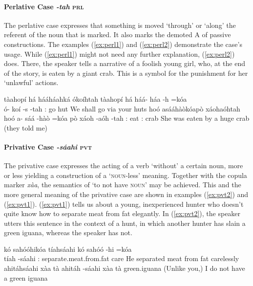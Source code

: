\documentclass[a4paper, 12pt, oneside]{memoir}
\newcommand{\emh}[1]{\textit{#1}}
\begin{document}
\paragraph{Perlative Case \emh{-tah} \textsc{prl}}
The perlative case expresses that something is moved `through' or `along' the referent of the noun that is marked. It also marks the demoted A of passive constructions. The examples (\ref{ex:perl1}) and (\ref{ex:perl2}) demonstrate the case's usage. While (\ref{ex:perl1}) might not need any further explanation, (\ref{ex:perl2}) does. There, the speaker tells a narrative of a foolish young girl, who, at the end of the story, is eaten by a giant crab. This is a symbol for the punishment for her `unlawful' actions.
\begin{examples}
\newbaarucmd{\cl}{\baarujuncture{\texttt{==}}}
\ex \label{ex:perl1}
\words tàahopí há hááháahká ókoíhtah
\bits tàahopí há háá- háa -h =kóa  \\ ó- koí -s -tah 
\gloss {\Fas}:{\Subject} {\Cngr} {\Hort} go {\Ff} {\Decl} {\Ssposs} hut {\Pl} {\Prl}
\tr We shall go via your huts
\ex \label{ex:perl2}
\words hoó asááhàòkóapò xáohaóhtah
\bits hoó a- sáá -hàò =kóa \cl pò xáoh -aóh -tah
\gloss {\Tsf}:{\Patient} {\Pass} eat {\Dpasto} {\Decl} {\Infer}:{\Dpast} crab {\Auga} {\Prl}
\tr She was eaten by a huge crab (they told me)
\end{examples}
\paragraph{Privative Case \emh{-sáahi} \textsc{pvt}}
The privative case expresses the acting of a verb `without' a certain noun, more or less yielding a construction of a `\textsc{noun}-less' meaning. Together with the copula marker \textit{xàa}, the semantics of `to not have \textsc{noun}' may be achieved. This and the more general meaning of the privative case are shown in examples (\ref{ex:pvt2}) and (\ref{ex:pvt1}). (\ref{ex:pvt1}) tells us about a young, inexperienced hunter who doesn't quite know how to separate meat from fat elegantly. In (\ref{ex:pvt2}), the speaker utters this sentence in the context of a hunt, in which another hunter has slain a green iguana, whereas the speaker has not.
\begin{examples}
\ex \label{ex:pvt1}
\words kó sahóóhikóa tíahsáahi
\bits kó sahóó -hi =kóa \\ tíah -sáahi
\gloss {\Tsm}:{\Subject} separate.meat.from.fat {\Rpastt} {\Decl} care {\Pvt}
\tr He separated meat from fat carelessly
\ex \label{ex:pvt2}
\words ahitáhsáahi xàa tà
\bits ahitáh -sáahi xàa tà
\gloss green.iguana {\Pvt} {\Cop} {\Fs}
\tr (Unlike you,) I do not have a green iguana
\end{examples}
\end{document}
